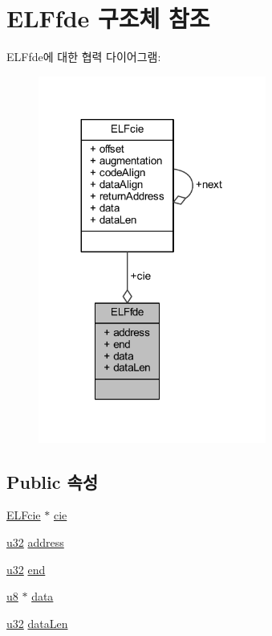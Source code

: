 \hypertarget{struct_e_l_ffde}{}\section{E\+L\+Ffde 구조체 참조}
\label{struct_e_l_ffde}


E\+L\+Ffde에 대한 협력 다이어그램\+:\nopagebreak
\begin{figure}[H]
\begin{center}
\leavevmode
\includegraphics[width=212pt]{struct_e_l_ffde__coll__graph}
\end{center}
\end{figure}
\subsection*{Public 속성}
\begin{DoxyCompactItemize}
\item 
\mbox{\hyperlink{struct_e_l_fcie}{E\+L\+Fcie}} $\ast$ \mbox{\hyperlink{struct_e_l_ffde_a3ecfd81fe700bcaf54ea8dd4e573066c}{cie}}
\item 
\mbox{\hyperlink{_system_8h_a10e94b422ef0c20dcdec20d31a1f5049}{u32}} \mbox{\hyperlink{struct_e_l_ffde_a56f664c17014d326fde32fcf334b1f7c}{address}}
\item 
\mbox{\hyperlink{_system_8h_a10e94b422ef0c20dcdec20d31a1f5049}{u32}} \mbox{\hyperlink{struct_e_l_ffde_a7adc7f88e82c38114747df8361ba3c05}{end}}
\item 
\mbox{\hyperlink{_system_8h_aed742c436da53c1080638ce6ef7d13de}{u8}} $\ast$ \mbox{\hyperlink{struct_e_l_ffde_a62e2ad316aaa29267516226b6e8f1e24}{data}}
\item 
\mbox{\hyperlink{_system_8h_a10e94b422ef0c20dcdec20d31a1f5049}{u32}} \mbox{\hyperlink{struct_e_l_ffde_a078548d5c62467613c4a8d57dbfb3396}{data\+Len}}
\end{DoxyCompactItemize}


